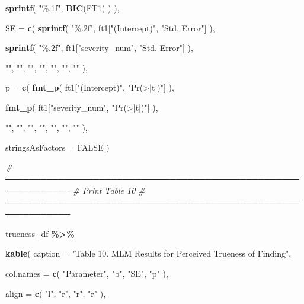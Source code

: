 \documentclass[
]{article}
\newenvironment{Shaded}{\begin{snugshade}}{\end{snugshade}}
\newcommand{\AttributeTok}[1]{\textcolor[rgb]{0.13,0.29,0.53}{#1}}
\newcommand{\CommentTok}[1]{\textcolor[rgb]{0.56,0.35,0.01}{\textit{#1}}}
\newcommand{\ConstantTok}[1]{\textcolor[rgb]{0.56,0.35,0.01}{#1}}
\newcommand{\FunctionTok}[1]{\textcolor[rgb]{0.13,0.29,0.53}{\textbf{#1}}}
\newcommand{\NormalTok}[1]{#1}
\newcommand{\SpecialCharTok}[1]{\textcolor[rgb]{0.81,0.36,0.00}{\textbf{#1}}}
\newcommand{\StringTok}[1]{\textcolor[rgb]{0.31,0.60,0.02}{#1}}
\begin{document}
\begin{Shaded}
\begin{Highlighting}[]
    \FunctionTok{sprintf}\NormalTok{(}
      \StringTok{"\%.1f"}\NormalTok{,}
      \FunctionTok{BIC}\NormalTok{(FT1)}
\NormalTok{    )}
\NormalTok{  ),}

  \AttributeTok{SE =} \FunctionTok{c}\NormalTok{(}
    \FunctionTok{sprintf}\NormalTok{(}
      \StringTok{"\%.2f"}\NormalTok{,}
\NormalTok{      ft1[}\StringTok{"(Intercept)"}\NormalTok{, }\StringTok{"Std. Error"}\NormalTok{]}
\NormalTok{    ),}

    \FunctionTok{sprintf}\NormalTok{(}
      \StringTok{"\%.2f"}\NormalTok{,}
\NormalTok{      ft1[}\StringTok{"severity\_num"}\NormalTok{, }\StringTok{"Std. Error"}\NormalTok{]}
\NormalTok{    ),}

    \StringTok{""}\NormalTok{, }\StringTok{""}\NormalTok{, }\StringTok{""}\NormalTok{, }\StringTok{""}\NormalTok{, }\StringTok{""}\NormalTok{, }\StringTok{""}\NormalTok{, }\StringTok{""}
\NormalTok{  ),}

  \AttributeTok{p =} \FunctionTok{c}\NormalTok{(}
    \FunctionTok{fmt\_p}\NormalTok{(}
\NormalTok{      ft1[}\StringTok{"(Intercept)"}\NormalTok{, }\StringTok{"Pr(\textgreater{}|t|)"}\NormalTok{]}
\NormalTok{    ),}

    \FunctionTok{fmt\_p}\NormalTok{(}
\NormalTok{      ft1[}\StringTok{"severity\_num"}\NormalTok{, }\StringTok{"Pr(\textgreater{}|t|)"}\NormalTok{]}
\NormalTok{    ),}

    \StringTok{""}\NormalTok{, }\StringTok{""}\NormalTok{, }\StringTok{""}\NormalTok{, }\StringTok{""}\NormalTok{, }\StringTok{""}\NormalTok{, }\StringTok{""}\NormalTok{, }\StringTok{""}
\NormalTok{  ),}

  \AttributeTok{stringsAsFactors =} \ConstantTok{FALSE}
\NormalTok{)}


\CommentTok{\# ─────────────────────────────────────────────────────────────}
\CommentTok{\# Print Table 10}
\CommentTok{\# ─────────────────────────────────────────────────────────────}

\NormalTok{trueness\_df }\SpecialCharTok{\%\textgreater{}\%}

  \FunctionTok{kable}\NormalTok{(}
    \AttributeTok{caption =}
      \StringTok{"Table 10. MLM Results for Perceived Trueness of Finding"}\NormalTok{,}

    \AttributeTok{col.names =} \FunctionTok{c}\NormalTok{(}
      \StringTok{"Parameter"}\NormalTok{,}
      \StringTok{"b"}\NormalTok{,}
      \StringTok{"SE"}\NormalTok{,}
      \StringTok{"p"}
\NormalTok{    ),}

    \AttributeTok{align =} \FunctionTok{c}\NormalTok{(}
      \StringTok{"l"}\NormalTok{,}
      \StringTok{"r"}\NormalTok{,}
      \StringTok{"r"}\NormalTok{,}
      \StringTok{"r"}
\NormalTok{    ),}


\end{Highlighting}
\end{Shaded}
\end{document}
